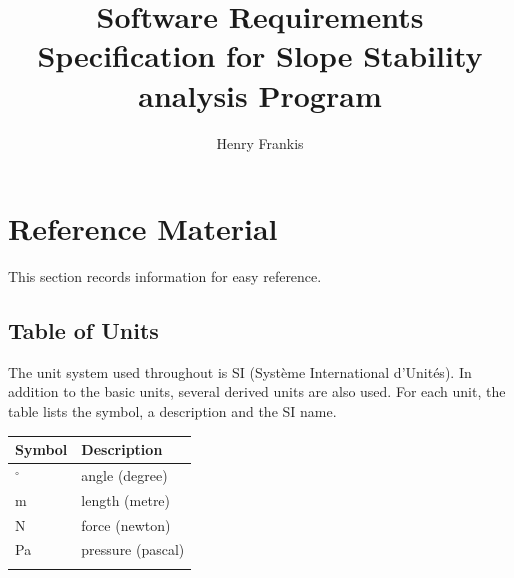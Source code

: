 \documentclass[12pt]{article}
\title{Software Requirements Specification for Slope Stability analysis Program}
\author{Henry Frankis}
\begin{document}
\maketitle
\tableofcontents
\newpage
\section{Reference Material}
\label{Sec:RefMat}
This section records information for easy reference.
\subsection{Table of Units}
\label{Sec:ToU}
The unit system used throughout is SI (Système International d'Unités). In addition to the basic units, several derived units are also used. For each unit, the table lists the symbol, a description and the SI name.
\begin{longtable*}{l l}
\toprule
Symbol & Description
\\
\midrule
\endhead
${}^{\circ}$ & angle (degree)
\\
m & length (metre)
\\
N & force (newton)
\\
Pa & pressure (pascal)
\\
\bottomrule
\label{Table:ToU}
\end{longtable*}
\end{document}
